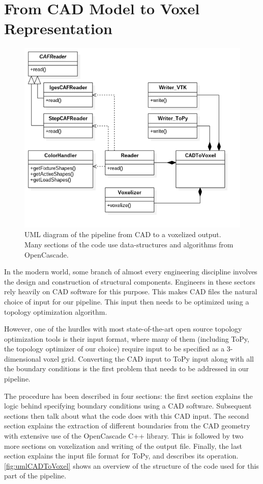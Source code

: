\section{From \acs{CAD} Model to Voxel Representation}
\label{sec: CADToVoxels}
\begin{figure}
  \centering
  \includegraphics[scale=0.5]{Pictures/CADToVoxel/UML_Complete_PNG.png}
\caption{UML diagram of the pipeline from CAD to a voxelized output. Many sections of the code use data-structures and algorithms from OpenCascade\cite{OpenCascade}.}
\label{fig:umlCADToVoxel}
\end{figure}

In the modern world, some branch of almost every engineering discipline involves the design and construction of structural components. Engineers in these sectors rely heavily on CAD software for this purpose. This makes CAD files the natural choice of input for our pipeline. This input then needs to be optimized using a topology optimization algorithm.

However, one of the hurdles with most state-of-the-art open source topology optimization tools is their input format, where many of them (including ToPy, the topology optimizer of our choice) require input to be specified as a 3-dimensional voxel grid. Converting the CAD input to ToPy input along with all the boundary conditions is the first problem that needs to be addressed in our pipeline.

The procedure has been described in four sections: the first section explains the logic behind specifying boundary conditions using a CAD software. Subsequent sections then talk about what the code does with this CAD input. The second section explains the extraction of different boundaries from the CAD geometry with extensive use of the OpenCascade C++ library. This is followed by two more sections on voxelization and writing of the output file. Finally, the last section explains the input file format for ToPy, and describes its operation. \autoref{fig:umlCADToVoxel} shows an overview of the structure of the code used for this part of the pipeline.

